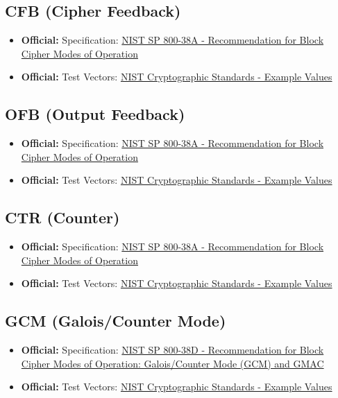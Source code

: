 \documentclass[12pt,a4paper]{article}
\newcommand{\official}[1]{\textcolor{citegreen}{\textbf{Official:}} #1}
\newcommand{\link}[2]{\href{#1}{#2}}
\begin{document}
\subsection{CFB (Cipher Feedback)}
\begin{itemize}
    \item \official{Specification:} \link{https://nvlpubs.nist.gov/nistpubs/SpecialPublications/NIST.SP.800-38A.pdf}{NIST SP 800-38A - Recommendation for Block Cipher Modes of Operation}
    \item \official{Test Vectors:} \link{https://csrc.nist.gov/Projects/cryptographic-standards-and-guidelines/example-values}{NIST Cryptographic Standards - Example Values}
\end{itemize}

\subsection{OFB (Output Feedback)}
\begin{itemize}
    \item \official{Specification:} \link{https://nvlpubs.nist.gov/nistpubs/SpecialPublications/NIST.SP.800-38A.pdf}{NIST SP 800-38A - Recommendation for Block Cipher Modes of Operation}
    \item \official{Test Vectors:} \link{https://csrc.nist.gov/Projects/cryptographic-standards-and-guidelines/example-values}{NIST Cryptographic Standards - Example Values}
\end{itemize}

\subsection{CTR (Counter)}
\begin{itemize}
    \item \official{Specification:} \link{https://nvlpubs.nist.gov/nistpubs/SpecialPublications/NIST.SP.800-38A.pdf}{NIST SP 800-38A - Recommendation for Block Cipher Modes of Operation}
    \item \official{Test Vectors:} \link{https://csrc.nist.gov/Projects/cryptographic-standards-and-guidelines/example-values}{NIST Cryptographic Standards - Example Values}
\end{itemize}

\subsection{GCM (Galois/Counter Mode)}
\begin{itemize}
    \item \official{Specification:} \link{https://nvlpubs.nist.gov/nistpubs/SpecialPublications/NIST.SP.800-38D.pdf}{NIST SP 800-38D - Recommendation for Block Cipher Modes of Operation: Galois/Counter Mode (GCM) and GMAC}
    \item \official{Test Vectors:} \link{https://csrc.nist.gov/Projects/cryptographic-standards-and-guidelines/example-values}{NIST Cryptographic Standards - Example Values}
\end{itemize}
\end{document}
